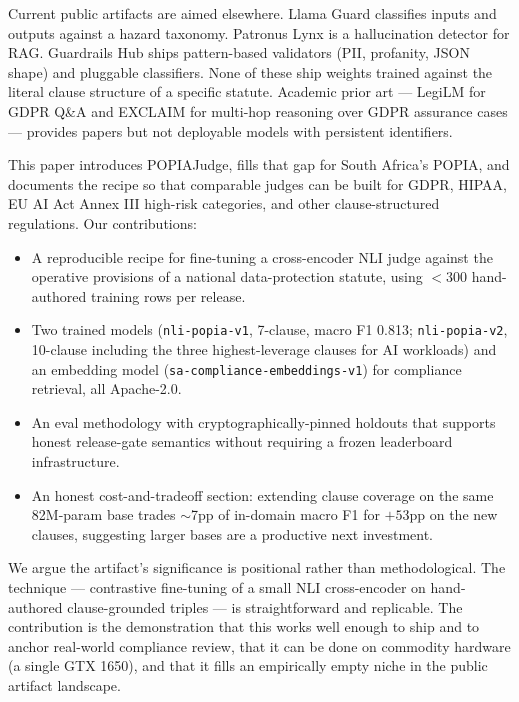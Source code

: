 \documentclass[11pt]{article}
\begin{document}
Current public artifacts are aimed elsewhere. Llama Guard \cite{llama-guard} classifies inputs and outputs against a hazard taxonomy. Patronus Lynx \cite{patronus-lynx} is a hallucination detector for RAG. Guardrails Hub \cite{guardrails-ai} ships pattern-based validators (PII, profanity, JSON shape) and pluggable classifiers. None of these ship weights trained against the literal clause structure of a specific statute. Academic prior art --- LegiLM \cite{legilm} for GDPR Q\&A and EXCLAIM \cite{exclaim} for multi-hop reasoning over GDPR assurance cases --- provides papers but not deployable models with persistent identifiers.

This paper introduces POPIAJudge, fills that gap for South Africa's POPIA, and documents the recipe so that comparable judges can be built for GDPR, HIPAA, EU AI Act Annex III high-risk categories, and other clause-structured regulations. Our contributions:

\begin{itemize}
\item A reproducible recipe for fine-tuning a cross-encoder NLI judge against the operative provisions of a national data-protection statute, using $<$300 hand-authored training rows per release.
\item Two trained models (\texttt{nli-popia-v1}, 7-clause, macro F1 0.813; \texttt{nli-popia-v2}, 10-clause including the three highest-leverage clauses for AI workloads) and an embedding model (\texttt{sa-compliance-embeddings-v1}) for compliance retrieval, all Apache-2.0.
\item An eval methodology with cryptographically-pinned holdouts that supports honest release-gate semantics without requiring a frozen leaderboard infrastructure.
\item An honest cost-and-tradeoff section: extending clause coverage on the same 82M-param base trades $\sim$7pp of in-domain macro F1 for $+53$pp on the new clauses, suggesting larger bases are a productive next investment.
\end{itemize}

We argue the artifact's significance is positional rather than methodological. The technique --- contrastive fine-tuning of a small NLI cross-encoder on hand-authored clause-grounded triples --- is straightforward and replicable. The contribution is the demonstration that this works well enough to ship and to anchor real-world compliance review, that it can be done on commodity hardware (a single GTX 1650), and that it fills an empirically empty niche in the public artifact landscape.
\end{document}
